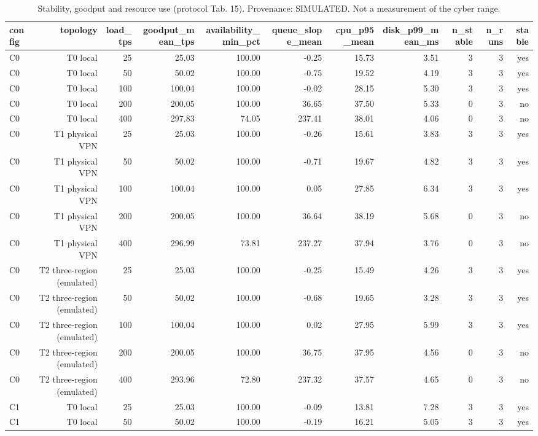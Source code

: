 \begin{table}[t]
\caption{Stability, goodput and resource use (protocol Tab. 15). Provenance: SIMULATED.  Not a measurement of the cyber range.}
\label{tab:table15_stability}
\centering
\begin{tabular}{lrrrrrrrrrr}
\hline
config & topology & load\_tps & goodput\_mean\_tps & availability\_min\_pct & queue\_slope\_mean & cpu\_p95\_mean & disk\_p99\_mean\_ms & n\_stable & n\_runs & stable \\
\hline
C0 & T0 local & 25 & 25.03 & 100.00 & -0.25 & 15.73 & 3.51 & 3 & 3 & yes \\
C0 & T0 local & 50 & 50.02 & 100.00 & -0.75 & 19.52 & 4.19 & 3 & 3 & yes \\
C0 & T0 local & 100 & 100.04 & 100.00 & -0.02 & 28.15 & 5.30 & 3 & 3 & yes \\
C0 & T0 local & 200 & 200.05 & 100.00 & 36.65 & 37.50 & 5.33 & 0 & 3 & no \\
C0 & T0 local & 400 & 297.83 & 74.05 & 237.41 & 38.01 & 4.06 & 0 & 3 & no \\
C0 & T1 physical VPN & 25 & 25.03 & 100.00 & -0.26 & 15.61 & 3.83 & 3 & 3 & yes \\
C0 & T1 physical VPN & 50 & 50.02 & 100.00 & -0.71 & 19.67 & 4.82 & 3 & 3 & yes \\
C0 & T1 physical VPN & 100 & 100.04 & 100.00 & 0.05 & 27.85 & 6.34 & 3 & 3 & yes \\
C0 & T1 physical VPN & 200 & 200.05 & 100.00 & 36.64 & 38.19 & 5.68 & 0 & 3 & no \\
C0 & T1 physical VPN & 400 & 296.99 & 73.81 & 237.27 & 37.94 & 3.76 & 0 & 3 & no \\
C0 & T2 three-region (emulated) & 25 & 25.03 & 100.00 & -0.25 & 15.49 & 4.26 & 3 & 3 & yes \\
C0 & T2 three-region (emulated) & 50 & 50.02 & 100.00 & -0.68 & 19.65 & 3.28 & 3 & 3 & yes \\
C0 & T2 three-region (emulated) & 100 & 100.04 & 100.00 & 0.02 & 27.95 & 5.99 & 3 & 3 & yes \\
C0 & T2 three-region (emulated) & 200 & 200.05 & 100.00 & 36.75 & 37.95 & 4.56 & 0 & 3 & no \\
C0 & T2 three-region (emulated) & 400 & 293.96 & 72.80 & 237.32 & 37.57 & 4.65 & 0 & 3 & no \\
C1 & T0 local & 25 & 25.03 & 100.00 & -0.09 & 13.81 & 7.28 & 3 & 3 & yes \\
C1 & T0 local & 50 & 50.02 & 100.00 & -0.19 & 16.21 & 5.05 & 3 & 3 & yes \\

\end{tabular}
\end{table}

